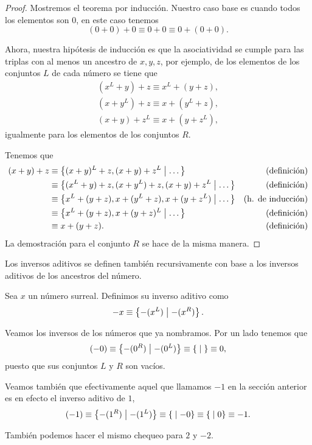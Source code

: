     \begin{proof}
        Mostremos el teorema por inducci\'on. Nuestro caso base es cuando todos los elementos son $0$, en este caso tenemos
        \[
            (0+0)+0 \equiv 0+0 \equiv 0+(0+0).
        \]

        Ahora, nuestra hip\'otesis de inducci\'on es que la asociatividad se cumple para las triplas con al menos un ancestro de $x,y,z$, por ejemplo, de los elementos de los conjuntos $L$ de cada n\'umero se tiene que
        \begin{align*}
            (x^L+y)+z \equiv x^L + (y+z), \\
            (x+y^L)+z \equiv x + (y^L+z), \\
            (x+y)+z^L \equiv x + (y+z^L),
        \end{align*}
        igualmente para los elementos de los conjuntos $R$.

        Tenemos que
        \begin{align*}
            (x+y)+z & \equiv \left\{(x+y)^L+z, (x+y)+z^L\;\middle|\; \dots\right\} & \text{(definici\'on)} \\
                    & \equiv \left\{(x^L+y)+z, (x+y^L)+z, (x+y)+z^L\;\middle|\; \dots\right\} & \text{(definici\'on)}  \\
                    & \equiv \left\{x^L+(y+z), x+(y^L+z), x+(y+z^L)\;\middle|\; \dots\right\} & \text{(h. de inducci\'on)}  \\
                    & \equiv \left\{x^L+(y+z), x+(y+z)^L\;\middle|\; \dots\right\} & \text{(definici\'on)}  \\
                    & \equiv x+(y+z). & \text{(definici\'on)}
        \end{align*}
        La demostraci\'on para el conjunto $R$ se hace de la misma manera.
    \end{proof}

    Los inversos aditivos se definen tambi\'en recursivamente con base a los inversos aditivos de los ancestros del n\'umero.

    \begin{definition}
        Sea $x$ un n\'umero surreal. Definimos su inverso aditivo como
        \[
            -x \equiv \left\{-(x^L)\;\middle|\; -(x^R)\right\}.
        \]
    \end{definition}

    \begin{example}
        Veamos los inversos de los n\'umeros que ya nombramos. Por un lado tenemos que
        \[
            (-0) \equiv \left\{-(0^R)\;\middle|\; -(0^L)\right\} \equiv \left\{\;\middle|\; \right\} \equiv 0,
        \]
        puesto que sus conjuntos $L$ y $R$ son vac\'ios.

        Veamos tambi\'en que efectivamente aquel que llamamos $-1$ en la secci\'on anterior es en efecto el inverso aditivo de $1$,
        \[
            (-1) \equiv \left\{-(1^R)\;\middle|\; -(1^L)\right\} \equiv \left\{\;\middle|\; -0\right\} \equiv \left\{\;\middle|\; 0\right\} \equiv -1.     
        \]

        Tambi\'en podemos hacer el mismo chequeo para $2$ y $-2$.
    \end{example}

